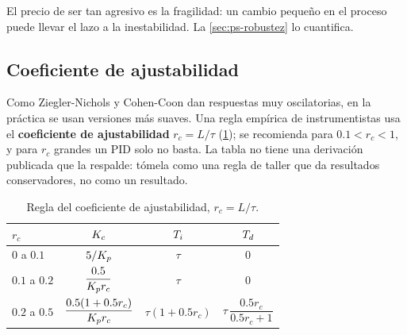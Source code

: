 El precio de ser tan agresivo es la fragilidad: un cambio pequeño en el proceso puede llevar el lazo a la inestabilidad. La \cref{sec:ps-robustez} lo cuantifica.

\subsection{Coeficiente de ajustabilidad}

Como Ziegler-Nichols y Cohen-Coon dan respuestas muy oscilatorias, en la práctica se usan versiones más suaves. Una regla empírica de instrumentistas usa el \textbf{coeficiente de ajustabilidad} $r_c=L/\tau$ (\cref{tab:ps-ajust}); se recomienda para $0.1<r_c<1$, y para $r_c$ grandes un PID solo no basta. La tabla no tiene una derivación publicada que la respalde: tómela como una regla de taller que da resultados conservadores, no como un resultado.

\begin{table}[H]
\centering
\caption{Regla del coeficiente de ajustabilidad, $r_c=L/\tau$.}
\label{tab:ps-ajust}
\renewcommand{\arraystretch}{1.5}
\begin{tabular}{@{}lccc@{}}
\toprule
$r_c$ & $K_c$ & $T_i$ & $T_d$\\
\midrule
$0$ a $0.1$ & $5/K_p$ & $\tau$ & $0$\\
$0.1$ a $0.2$ & $\dfrac{0.5}{K_p r_c}$ & $\tau$ & $0$\\
$0.2$ a $0.5$ & $\dfrac{0.5(1+0.5r_c)}{K_p r_c}$ & $\tau(1+0.5r_c)$ & $\tau\,\dfrac{0.5r_c}{0.5r_c+1}$\\
\bottomrule
\end{tabular}
\end{table}

